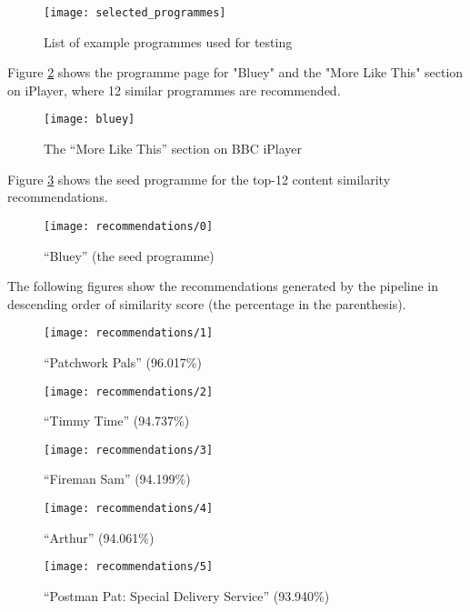 \begin{figure}[H]
  \centering
  \texttt{[image: selected\_programmes]}
  \caption{List of example programmes used for testing}
  \label{fig:selected_programmes}
\end{figure}

Figure \ref{fig:bluey} shows the programme page for "Bluey" and the "More Like This" section on iPlayer,
where 12 similar programmes are recommended.

\begin{figure}[H]
  \centering
  \texttt{[image: bluey]}
  \caption{The ``More Like This'' section on BBC iPlayer}
  \label{fig:bluey}
\end{figure}

Figure \ref{fig:recommendations:0} shows the seed programme for the top-12 content similarity recommendations.

\begin{figure}[H]
  \centering
  \texttt{[image: recommendations/0]}
  \caption{``Bluey'' (the seed programme)}
  \label{fig:recommendations:0}
\end{figure}

The following figures show the recommendations generated by the pipeline in descending order of similarity score (the percentage in the parenthesis).

\begin{figure}[H]
  \centering
  \texttt{[image: recommendations/1]}
  \caption{``Patchwork Pals'' (96.017\%) }
  \label{fig:recommendations:1}
\end{figure}

\begin{figure}[H]
  \centering
  \texttt{[image: recommendations/2]}
  \caption{``Timmy Time'' (94.737\%)}
  \label{fig:recommendations:2}
\end{figure}

\begin{figure}[H]
  \centering
  \texttt{[image: recommendations/3]}
  \caption{``Fireman Sam'' (94.199\%)}
  \label{fig:recommendations:3}
\end{figure}

\begin{figure}[H]
  \centering
  \texttt{[image: recommendations/4]}
  \caption{``Arthur'' (94.061\%)}
  \label{fig:recommendations:4}
\end{figure}

\begin{figure}[H]
  \centering
  \texttt{[image: recommendations/5]}
  \caption{``Postman Pat: Special Delivery Service'' (93.940\%)}
  \label{fig:recommendations:5}
\end{figure}

